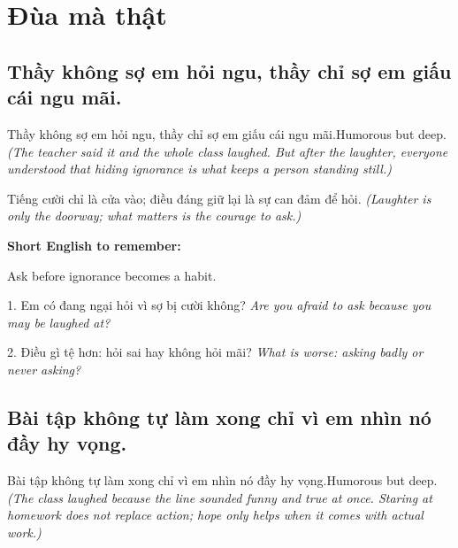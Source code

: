 \chapter{Đùa mà thật}

\section{Thầy không sợ em hỏi ngu, thầy chỉ sợ em giấu cái ngu mãi.}
\begin{truyen}{Thầy không sợ em hỏi ngu, thầy chỉ sợ em giấu cái ngu mãi.}{Humorous but deep.}
\textit{(The teacher said it and the whole class laughed. But after the laughter, everyone understood that hiding ignorance is what keeps a person standing still.)}
\end{truyen}

\begin{baihoc}
Tiếng cười chỉ là cửa vào; điều đáng giữ lại là sự can đảm để hỏi.
\textit{(Laughter is only the doorway; what matters is the courage to ask.)}
\end{baihoc}

\begin{ghinhoanh}
\textbf{Short English to remember:}

Ask before ignorance becomes a habit.

\end{ghinhoanh}

\begin{tuhocnhanh}
1. Em có đang ngại hỏi vì sợ bị cười không? \textit{Are you afraid to ask because you may be laughed at?}

2. Điều gì tệ hơn: hỏi sai hay không hỏi mãi? \textit{What is worse: asking badly or never asking?}
\end{tuhocnhanh}
\ngancach

\section{Bài tập không tự làm xong chỉ vì em nhìn nó đầy hy vọng.}
\begin{truyen}{Bài tập không tự làm xong chỉ vì em nhìn nó đầy hy vọng.}{Humorous but deep.}
\textit{(The class laughed because the line sounded funny and true at once. Staring at homework does not replace action; hope only helps when it comes with actual work.)}
\end{truyen}

